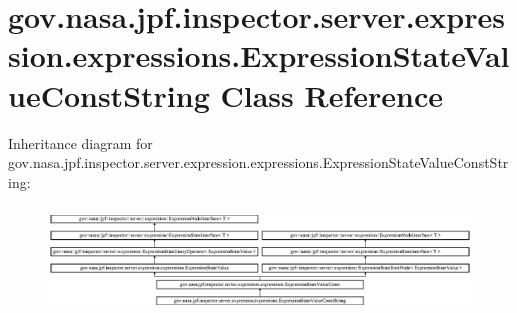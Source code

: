 \hypertarget{classgov_1_1nasa_1_1jpf_1_1inspector_1_1server_1_1expression_1_1expressions_1_1_expression_state_value_const_string}{}\section{gov.\+nasa.\+jpf.\+inspector.\+server.\+expression.\+expressions.\+Expression\+State\+Value\+Const\+String Class Reference}
\label{classgov_1_1nasa_1_1jpf_1_1inspector_1_1server_1_1expression_1_1expressions_1_1_expression_state_value_const_string}
Inheritance diagram for gov.\+nasa.\+jpf.\+inspector.\+server.\+expression.\+expressions.\+Expression\+State\+Value\+Const\+String\+:\begin{figure}[H]
\begin{center}
\leavevmode
\includegraphics[height=2.847458cm]{classgov_1_1nasa_1_1jpf_1_1inspector_1_1server_1_1expression_1_1expressions_1_1_expression_state_value_const_string}
\end{center}
\end{figure}
